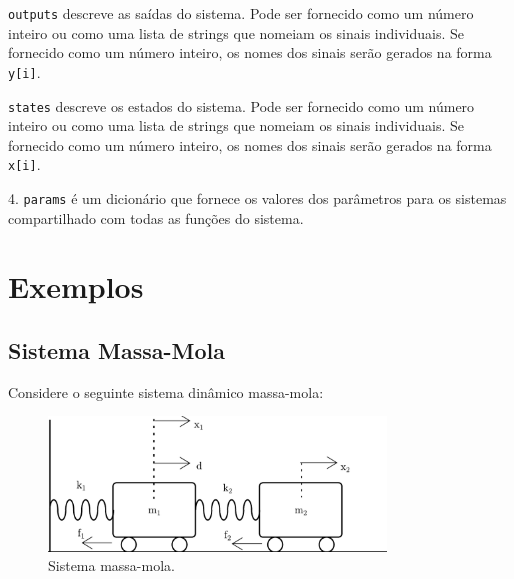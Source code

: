 \texttt{outputs} descreve as saídas do sistema. Pode ser fornecido como um número inteiro ou como uma lista de strings que nomeiam os sinais individuais. Se fornecido como um número inteiro, os nomes dos sinais serão gerados na forma \texttt{y[i]}.

\texttt{states} descreve os estados do sistema. Pode ser fornecido como um número inteiro ou como uma lista de strings que nomeiam os sinais individuais. Se fornecido como um número inteiro, os nomes dos sinais serão gerados na forma \texttt{x[i]}.

4. \texttt{params} é um dicionário que fornece os valores dos parâmetros para os sistemas compartilhado com todas as funções do sistema.

\section{Exemplos}

\subsection{Sistema Massa-Mola}

Considere o seguinte sistema dinâmico massa-mola:

\begin{figure}[H]
  \centering
  \includegraphics[width=0.8\textwidth]{figuras/sistema_massa_mola.png}
  \caption{Sistema massa-mola.}
  \label{fig:sistema_massa_mola}
\end{figure}

